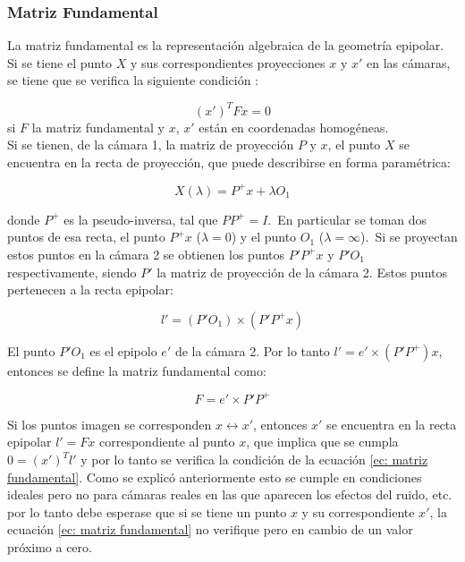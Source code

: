 \subsubsection{Matriz Fundamental}

La matriz fundamental es la representación algebraica de la geometría epipolar. Si se tiene el punto $X$ y sus correspondientes proyecciones $x$ y $x'$ en las cámaras, se tiene que se verifica la siguiente condición :

\begin{equation}
(x')^T F x = 0
\label{ec: matriz fundamental}
\end{equation}
si  $F$ la matriz fundamental y $x$, $x'$ están en coordenadas homogéneas.\\

Si se tienen, de la cámara 1, la matriz de proyección $P$ y $x$, el punto $X$ se encuentra en la recta de proyección, que puede describirse en forma paramétrica:

\begin{equation}
	X(\lambda) = P^+x+\lambda O_1
\end{equation}

donde $P^+$ es la pseudo-inversa, tal que $PP^+=I$.\
En particular se toman dos puntos de esa recta, el punto $P^+x$ ($\lambda = 0$) y el punto $O_1$ ($\lambda = \infty$).\
Si se proyectan estos puntos en la cámara 2 se obtienen los puntos $P'P^+x$ y $P'O_1$ respectivamente, siendo $P'$ la matriz de proyección de la cámara 2. Estos puntos pertenecen a la recta epipolar:

\begin{equation}
l' = (P'O_1) \times (P'P^+ x)
\end{equation}

El punto $P'O_1$ es el epipolo $e'$ de la cámara 2. Por lo tanto $l' = e' \times (P'P^+) x$, entonces se define la matriz fundamental como:

\begin{equation}
F=e' \times P'P^+
\end{equation}

Si los puntos imagen se corresponden $x \leftrightarrow x'$, entonces $x'$ se encuentra en la recta epipolar $l'=Fx$ correspondiente al punto $x$, que implica que se cumpla $0=(x')^Tl'$ y por lo tanto se verifica la condición de la ecuación \ref{ec: matriz fundamental}. Como se explicó anteriormente esto se cumple en condiciones ideales pero no para cámaras reales en las que aparecen los efectos del ruido, etc. por lo tanto debe esperase que si se tiene un punto $x$ y su correspondiente $x'$, la ecuación \ref{ec: matriz fundamental} no verifique pero en cambio de un valor próximo a cero.\\

